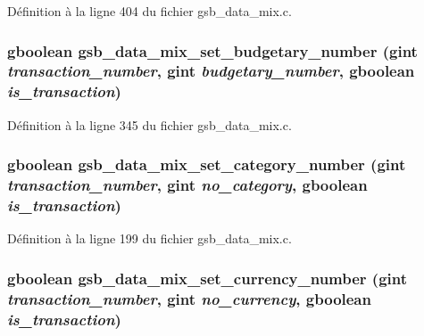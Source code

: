 Définition à la ligne 404 du fichier gsb\_\-data\_\-mix.c.

\subsubsection[{gsb\_\-data\_\-mix\_\-set\_\-budgetary\_\-number}]{\setlength{\rightskip}{0pt plus 5cm}gboolean gsb\_\-data\_\-mix\_\-set\_\-budgetary\_\-number (gint {\em transaction\_\-number}, \/  gint {\em budgetary\_\-number}, \/  gboolean {\em is\_\-transaction})}\label{gsb__data__mix_8h_a994eba0bb188e850a488d9cf0bbce05e}


Définition à la ligne 345 du fichier gsb\_\-data\_\-mix.c.

\subsubsection[{gsb\_\-data\_\-mix\_\-set\_\-category\_\-number}]{\setlength{\rightskip}{0pt plus 5cm}gboolean gsb\_\-data\_\-mix\_\-set\_\-category\_\-number (gint {\em transaction\_\-number}, \/  gint {\em no\_\-category}, \/  gboolean {\em is\_\-transaction})}\label{gsb__data__mix_8h_a029842af9cad6db80d07dd9650944d08}


Définition à la ligne 199 du fichier gsb\_\-data\_\-mix.c.

\subsubsection[{gsb\_\-data\_\-mix\_\-set\_\-currency\_\-number}]{\setlength{\rightskip}{0pt plus 5cm}gboolean gsb\_\-data\_\-mix\_\-set\_\-currency\_\-number (gint {\em transaction\_\-number}, \/  gint {\em no\_\-currency}, \/  gboolean {\em is\_\-transaction})}\label{gsb__data__mix_8h_af48fe57865c39cceaf3199f4b24dae12}


